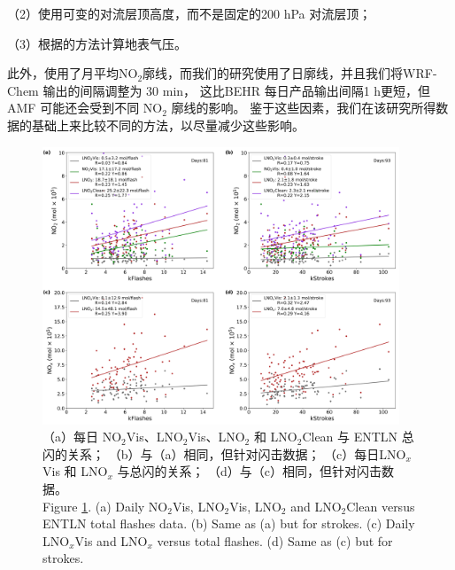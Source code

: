 （2）使用可变的对流层顶高度，而不是固定的200 hPa 对流层顶；

（3）根据\citet{Zhou.2009}的方法计算地表气压。

此外，\citet{Lapierre.2020}使用了月平均NO$_2$廓线，而我们的研究使用了日廓线，并且我们将WRF-Chem 输出的间隔调整为 30 min，
这比BEHR 每日产品输出间隔1 h更短，但 AMF 可能还会受到不同 NO$_2$ 廓线的影响。
鉴于这些因素，我们在该研究所得数据的基础上来比较不同的方法，以尽量减少这些影响。

\begin{figure}[H]
\centering
\includegraphics[width=0.95\textwidth]{./figures/us_pe_linear.png}
\caption{（a）每日 NO$_2$Vis、LNO$_2$Vis、LNO$_2$ 和 LNO$_2$Clean 与 ENTLN 总闪的关系；
（b）与（a）相同，但针对闪击数据；
（c）每日LNO$_x$Vis 和 LNO$_x$ 与总闪的关系；
（d）与（c）相同，但针对闪击数据。\\
Figure \ref{fig:us_pe_linear}.
(a) Daily NO$_2$Vis, LNO$_2$Vis, LNO$_2$ and LNO$_2$Clean versus ENTLN total flashes data.
(b) Same as (a) but for strokes.
(c) Daily LNO$_x$Vis and LNO$_x$ versus total flashes.
(d) Same as (c) but for strokes.}
\label{fig:us_pe_linear}
\end{figure}



